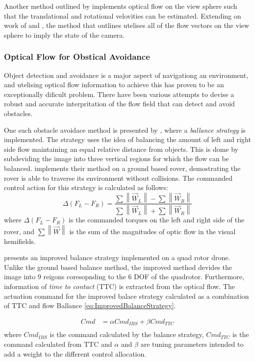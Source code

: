 \documentclass{UoNMCHA}
\newcommand{\norm}[1]{\left\lVert#1\right\rVert}
\numberwithin{equation}{section}
\begin{document}
Another method outlined by \cite{TimsFYP} implements optical flow on the view sphere such that the translational and rotational velovities can be estimated. Extending on work of \cite{nelson1988finding} and \cite{4209850}, the method that \cite{TimsFYP} outlines utelises all of the flow vectors on the view sphere to imply the state of the camera.

\subsubsection{Optical Flow for Obstical Avoidance}
Object detection and avoidance is a major aspect of navigationg an environment, and utelising optical flow information to achieve this has proven to be an exceptionally dificult problem. There have been various attempts to devise a robust and accurate interpritation of the flow field that can detect and avoid obstacles.

One such obstacle avoidace method is presented by \cite{souhila2007optical}, where a \textit{ballance strategy} is implemented. The strategy uses the idea of balancing the amount of left and right side flow maintaining an equal relative distance from objects. This is dome by subdeviding the image into three vertical regions for which the flow can be balanced. \cite{souhila2007optical} implements their method on a ground based rover, demostrating the rover is able to traverse its environment without collisions. The commanded control action for this strategy is calculated as follows:
\begin{equation}
	\Delta (F_{L} - F_{R}) = \frac{\sum{\norm{\vec{W}_{L}}} - \sum{\norm{\vec{W}_{R}}}}{\sum{\norm{\vec{W}_{L}}} + \sum{\norm{\vec{W}_{R}}}}
\end{equation}
where $\Delta(F_{L} - F_{R})$ is the commanded torques on the left and right side of the rover, and $\sum{\norm{\vec{W}}}$ is the sum of the magnitudes of optic flow in the visual hemifields.

\cite{wang2015obstacle} presents an improved balance strategy implemented on a quad rotor drone. Unlike the ground based balance method, the improved method devides the image into 9 reigons coresopnding to the 6 DOF of the quadrotor. Furthermore, information of \textit{time to contact} (TTC) is extracted from the optical flow. The actuation command for the improved balace strategy calculated as a combination of TTC and flow Ballance \cref{eq:ImprovedBalanceStrategy}.

\begin{equation}\label{eq:ImprovedBalanceStrategy}
	\begin{split}
		Cmd &= \alpha Cmd_{IBS} + \beta Cmd_{TTC}\\
	\end{split}
\end{equation}
where $Cmd_{IBS}$ is the command calculated by the balance strategy, $Cmd_{TTC}$ is the command calculated from TTC and $\alpha$ and $\beta$ are tuning parameters intended to add a weight to the different control allocation.
\end{document}
